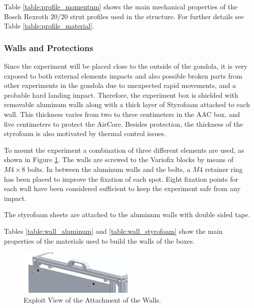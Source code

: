 \bigskip
Table \ref{table:profile_momentum} shows the main mechanical properties of the Bosch Rexroth $20/20$ strut profiles used in the structure. For further details see Table \ref{table:profile_material}.



\smallskip

\subsubsection{Walls and Protections}
\label{sec:4.4.2}

Since the experiment will be placed close to the outside of the gondola, it is very exposed to both external elements impacts and also possible broken parts from other experiments in the gondola due to unexpected rapid movements, and a probable hard landing impact. Therefore, the experiment box is shielded with removable aluminum walls along with a thick layer of Styrofoam attached to each wall. This thickness varies from two to three centimeters in the AAC box, and five centimeters to protect the AirCore. Besides protection, the thickness of the styrofoam is also motivated by thermal control issues.

To mount the experiment a combination of three different elements are used, as shown in Figure \ref{fig:wall_attach}. The walls are screwed to the Variofix blocks by means of $M4\times8$ bolts. In between the aluminum walls and the bolts, a $M4$ retainer ring has been placed to improve the fixation of each spot. Eight fixation points for each wall have been considered sufficient to keep the experiment safe from any impact.

The styrofoam sheets are attached to the aluminum walls with double sided tape.

Tables \ref{table:wall_aluminum} and \ref{table:wall_styrofoam} show the main properties of the materials used to build the walls of the boxes.

 \begin{figure}[H]
     \centering
     \includegraphics[width=0.5\textwidth]{4-experiment-design/img/Mechanical/wall_attachment.jpg}
     \caption{Exploit View of the Attachment of the Walls.}
     \label{fig:wall_attach}
\end{figure}

